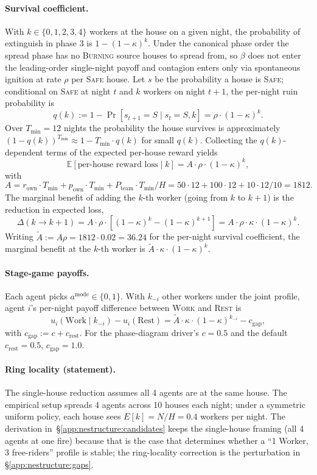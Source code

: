 \documentclass{anvil-paper}
\begin{document}
\paragraph{Survival coefficient.}
With $k\in\{0,1,2,3,4\}$ workers at the house on a given night, the
probability of extinguish in phase 3 is $1-(1-\kappa)^k$. Under the
canonical phase order the spread phase has no \textsc{Burning} source
houses to spread from, so $\beta$ does not enter the leading-order
single-night payoff and contagion enters only via spontaneous ignition
at rate $\rho$ per \textsc{Safe} house. Let $s$ be the probability a
house is \textsc{Safe}; conditional on \textsc{Safe} at night $t$ and
$k$ workers on night $t{+}1$, the per-night ruin probability is
\[
  q(k) := 1 - \Pr[s_{t+1}{=}S\mid s_t{=}S,k] = \rho\cdot(1-\kappa)^k.
\]
Over $T_{\min}{=}12$ nights the probability the house survives is
approximately $(1-q(k))^{T_{\min}}\approx 1-T_{\min}\cdot q(k)$ for small
$q(k)$. Collecting the $q(k)$-dependent terms of the expected per-house
reward yields
\[
  \mathbb{E}[\text{per-house reward loss}\mid k]
  = A\cdot\rho\cdot(1-\kappa)^k,
\]
with
\[
  A = r_{\text{own}}\cdot T_{\min}
    + p_{\text{own}}\cdot T_{\min}
    + P_{\text{team}}\cdot T_{\min}/H
    = 50\cdot 12 + 100\cdot 12 + 10\cdot 12/10 = 1812.
\]
The marginal benefit of adding the $k$-th worker (going from $k$ to
$k{+}1$) is the reduction in expected loss,
\[
  \Delta(k\to k{+}1)
  = A\cdot\rho\cdot[(1{-}\kappa)^k-(1{-}\kappa)^{k+1}]
  = A\cdot\rho\cdot\kappa\cdot(1-\kappa)^k.
\]
Writing $\tilde A:=A\rho=1812\cdot 0.02=36.24$ for the per-night
survival coefficient, the marginal benefit at the $k$-th worker is
$\tilde A\cdot\kappa\cdot(1-\kappa)^k$.

\paragraph{Stage-game payoffs.}
Each agent picks $a^{\text{mode}}\in\{0,1\}$. With $k_{-i}$ other
workers under the joint profile, agent $i$'s per-night payoff
difference between \textsc{Work} and \textsc{Rest} is
\[
  u_i(\text{Work}\mid k_{-i}) - u_i(\text{Rest})
  = \tilde A\cdot\kappa\cdot(1-\kappa)^{k_{-i}} - c_{\text{gap}},
\]
with $c_{\text{gap}}:=c+c_{\text{rest}}$. For the phase-diagram driver's
$c{=}0.5$ and the default $c_{\text{rest}}{=}0.5$, $c_{\text{gap}}=1.0$.

\paragraph{Ring locality (statement).}
The single-house reduction assumes all 4 agents are at the same house.
The empirical setup spreads 4 agents across 10 houses each night; under
a symmetric uniform policy, each house sees $E[k]=N/H=0.4$ workers per
night. The derivation in~\S\ref{app:nestructure:candidates} keeps the
single-house framing (all 4 agents at one fire) because that is the
case that determines whether a ``1 Worker, 3 free-riders'' profile is
stable; the ring-locality correction is the perturbation in
\S\ref{app:nestructure:gaps}.
\end{document}
